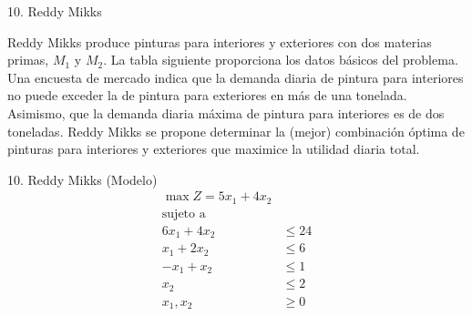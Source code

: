 \begin{frameExample}{10. Reddy Mikks  }

  \label{example:reddy-mikks}
    Reddy Mikks produce pinturas para interiores y exteriores con dos materias primas, $M_1$ y $M_2$. La tabla siguiente proporciona los datos básicos del problema. Una encuesta de mercado indica que la demanda diaria de pintura para interiores no puede exceder la de pintura para exteriores en más de una tonelada. Asimismo, que la demanda diaria máxima de pintura para interiores es de dos toneladas. Reddy Mikks se propone determinar la (mejor) combinación óptima de pinturas para interiores y exteriores que maximice la utilidad diaria total.%

    {\centering
      \par}
  

\end{frameExample}

\begin{frameExample}{10. Reddy Mikks (Modelo) }{}
    \begin{align*}
      \max Z = 5x_1 + 4x_2 & \\[3mm]
      \text{sujeto a } & \\[2mm]
    6x_1 + 4x_2 & \leq 24\\
    x_1 + 2x_2 & \leq 6\\
    -x_1 + x_2 & \leq 1\\
    x_2 & \leq 2\\[5mm]
    x_1, x_2 & \geq 0
  \end{align*}
\end{frameExample}


